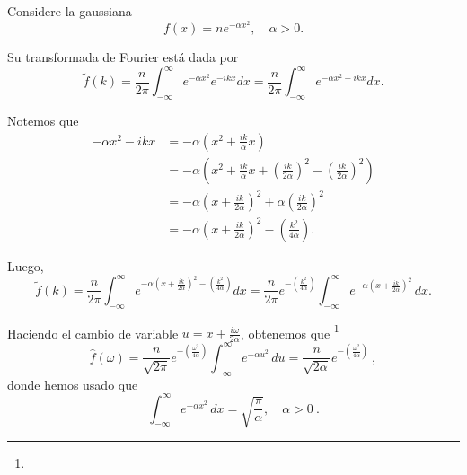 \begin{ejemplo}

Considere la gaussiana
$$f(x) = n e^{-\alpha x^2}, \quad  \alpha > 0.$$

Su transformada de Fourier está dada por 
\begin{equation*}
    \tilde{f}(k) =  \frac{n}{2\pi} \int_{-\infty}^{\infty} e^{-\alpha x^2} e^{-ikx} dx =  \frac{n}{2\pi} \int_{-\infty}^{\infty} e^{-\alpha x^2-ikx} dx .
\end{equation*}

Notemos que 
\begin{align*}
    -\alpha x^2-ikx &= - \alpha \left( x^2 + \frac{ik}{\alpha}x \right) \\
    &= - \alpha \left( x^2 + \frac{ik}{\alpha} x + \left( \frac{ik}{2\alpha} \right)^2 - \left( \frac{ik}{2\alpha} \right)^2 \right) \\
    &= - \alpha \left( x + \frac{ik}{2\alpha} \right)^2 + \alpha \left( \frac{ik}{2\alpha} \right)^2 \\
    &= - \alpha \left( x + \frac{ik}{2\alpha} \right)^2 - \left( \frac{k^2}{4\alpha} \right).
\end{align*}

Luego, 
\begin{equation*}
    \tilde{f}(k) =  \frac{n}{2\pi} \int_{-\infty}^{\infty} e^{-\alpha \left( x + \frac{ik}{2\alpha} \right)^2 - \left( \frac{k^2}{4\alpha} \right)}  dx = \frac{n}{2\pi} e^{- \left( \frac{k^2}{4\alpha} \right)} \int_{-\infty}^{\infty} e^{-\alpha \left( x + \frac{ik}{2\alpha} \right)^2} \,dx. 
\end{equation*}

Haciendo el cambio de variable $u = x + \frac{i\omega}{2\alpha}$, obtenemos que \footnote{}
\begin{equation}\label{eq:Fourier-Gaussiana}
    \hat{f}(\omega) = \frac{n}{\sqrt{2\pi}} e^{- \left( \frac{\omega^2}{4\alpha} \right)} \int_{-\infty}^{\infty} e^{-\alpha u^2} \,du = \frac{n}{\sqrt{2\alpha}} e^{- \left( \frac{\omega^2}{4\alpha} \right)} \ ,
\end{equation}
donde hemos usado que 
\begin{equation}
\int_{-\infty}^{\infty} e^{-\alpha x^2} \,dx = \sqrt{\frac{\pi}{\alpha}}, \quad \alpha > 0 \ . 
\end{equation} 


\end{ejemplo}

